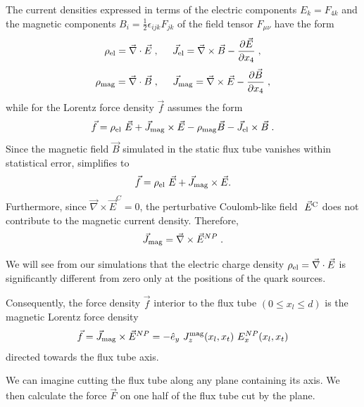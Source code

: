 \documentclass[pdftex,twocolumn,epjc3,envcountsect]{svjour3}
\begin{document}
The current densities expressed in terms of the electric components $E_k = F_{4k}$ and the magnetic components $B_i = \frac{1}{2} \epsilon_{ijk} F_{jk}$ of the field tensor $F_{\mu \nu}$ have the form
 \begin{equation}
    \rho_{\rm el}  = \vec{\nabla} \cdot \vec{E}\;, \;\;\;\;\; \vec{J}_{\rm el} = \vec{\nabla} \times \vec{B} - \frac{\partial \vec{E}}{\partial x_4}\;,
    \label{fieldderivs2}
\end{equation}
\begin{equation}
    \rho_{\rm mag} = \vec{\nabla} \cdot \vec{B}\;, \;\;\;\;\;\vec{J}_{\rm mag} = \vec{\nabla} \times \vec{E} - \frac{\partial \vec{B}}{\partial x_4}\;,
    \label{fieldderivs1}
 \end{equation}
while  for the
Lorentz force density $\vec{f}$ assumes the  form 
\begin{equation}
    \vec{f} = \rho_{\rm el} ~\vec{E} + \vec{J}_{\rm mag}  \times \vec{E} - \rho_{\rm mag}  \vec{B} - \vec{J}_{\rm el} \times \vec{B}\;.
\label{vecfdensity}
\end{equation}
Since the magnetic field $\vec{B}$ simulated in the static flux tube vanishes within statistical error, 
simplifies to
\begin{equation}
    \vec{f} = \rho_{\rm el}~ \vec{E} + \vec{J}_{\rm mag} \times \vec{E}.
   \label{vecf1}
\end{equation}
Furthermore, since $\vec{\nabla} \times \vec{E}^C =0$, the perturbative Coulomb-like field $~\vec{E}^{\rm C}$ does not contribute to the magnetic current density. Therefore,
\begin{equation}
\vec{J}_{\rm mag} = \vec{\nabla} \times\vec{E}^{NP}\;.
\label{Jmagandrhoel}
\end{equation}

We will see from our simulations that the electric charge density $\rho_{\rm el} = \vec{\nabla} \cdot \vec{E}$ is significantly different from zero only at the positions of the quark sources.

Consequently, the force density $\vec{f}$ interior to the flux tube $(0 \le x_l \le d)$ is the magnetic Lorentz force density 
\begin{equation}
 \vec{f} = \vec{J}_{\rm mag} \times \vec{E}^{NP} = - \hat{e}_y ~J^{\rm mag}_z (x_l, x_t)\ E^{NP}_x (x_l, x_t)
  \label{vecf}
  \end{equation}
directed towards the flux tube axis.

We can imagine cutting the flux tube along any plane containing its axis. We then calculate  the force $\vec{F}$ on one half of the flux tube cut by the plane.
\end{document}
